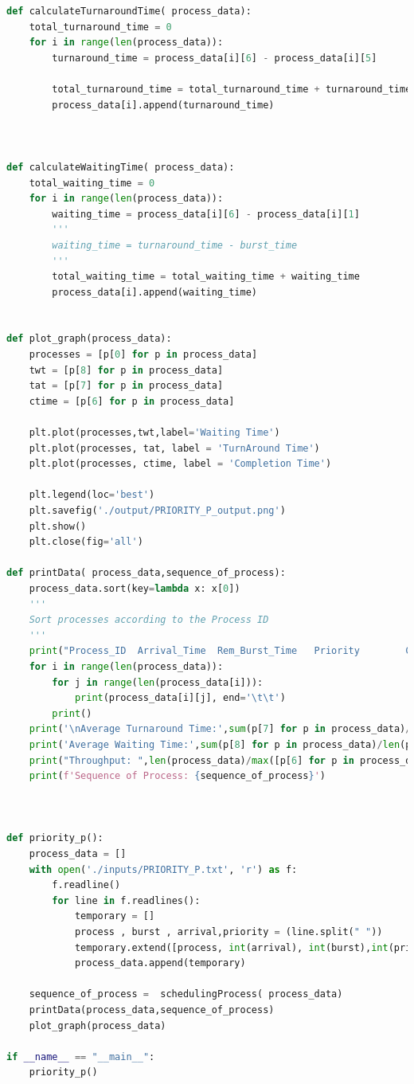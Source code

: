 \documentclass[11pt,a4paper]{report}
\begin{document}
\begin{lstlisting}[language=Python,caption=SJF Preemptive Source code,breaklines=true,postbreak=\mbox{\textcolor{red}{$\hookrightarrow$}\space},]
def calculateTurnaroundTime( process_data):
	total_turnaround_time = 0
	for i in range(len(process_data)):
		turnaround_time = process_data[i][6] - process_data[i][5]

		total_turnaround_time = total_turnaround_time + turnaround_time
		process_data[i].append(turnaround_time)



def calculateWaitingTime( process_data):
	total_waiting_time = 0
	for i in range(len(process_data)):
		waiting_time = process_data[i][6] - process_data[i][1]
		'''
		waiting_time = turnaround_time - burst_time
		'''
		total_waiting_time = total_waiting_time + waiting_time
		process_data[i].append(waiting_time)


def plot_graph(process_data):
	processes = [p[0] for p in process_data]
	twt = [p[8] for p in process_data]
	tat = [p[7] for p in process_data]
	ctime = [p[6] for p in process_data]

	plt.plot(processes,twt,label='Waiting Time')
	plt.plot(processes, tat, label = 'TurnAround Time')
	plt.plot(processes, ctime, label = 'Completion Time')

	plt.legend(loc='best')
	plt.savefig('./output/PRIORITY_P_output.png')
	plt.show()
	plt.close(fig='all')

def printData( process_data,sequence_of_process):
	process_data.sort(key=lambda x: x[0])
	'''
	Sort processes according to the Process ID
	'''
	print("Process_ID  Arrival_Time  Rem_Burst_Time   Priority        Completed  Orig_Burst_Time Completion_Time  Turnaround_Time  Waiting_Time")
	for i in range(len(process_data)):
		for j in range(len(process_data[i])):
			print(process_data[i][j], end='\t\t')
		print()
	print('\nAverage Turnaround Time:',sum(p[7] for p in process_data)/len(process_data))
	print('Average Waiting Time:',sum(p[8] for p in process_data)/len(process_data))
	print("Throughput: ",len(process_data)/max([p[6] for p in process_data]))
	print(f'Sequence of Process: {sequence_of_process}')



def priority_p():
	process_data = []
	with open('./inputs/PRIORITY_P.txt', 'r') as f:
		f.readline()
		for line in f.readlines():
			temporary = []
			process , burst , arrival,priority = (line.split(" "))
			temporary.extend([process, int(arrival), int(burst),int(priority), 0,int(burst)])
			process_data.append(temporary)

	sequence_of_process =  schedulingProcess( process_data)
	printData(process_data,sequence_of_process)
	plot_graph(process_data)

if __name__ == "__main__":
	priority_p()
\end{lstlisting}
\end{document}
